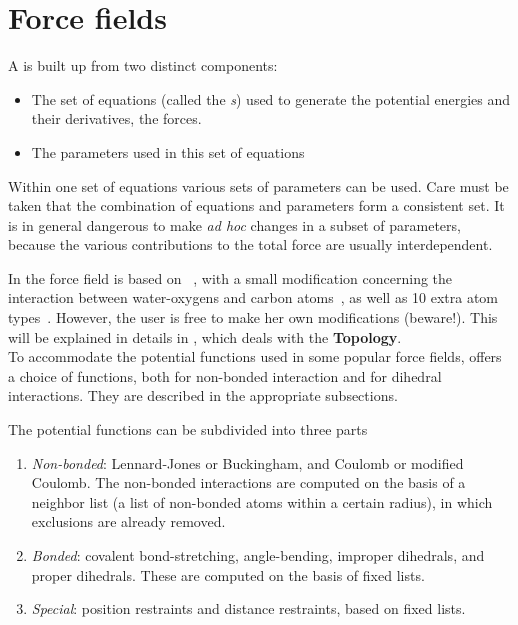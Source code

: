 % 
% 
% 
% 
% 
% 
% 
% 
%

\chapter{Force fields}
\label{ch:ff}
A  is built up from two distinct components:
\begin{itemize}
\item The set of equations (called the {\em
{}s}) used to generate the potential
energies and their derivatives, the forces.
\item The parameters used in this set of equations
\end{itemize}
Within one set of equations various sets of parameters can be
used. Care must be taken that the combination of equations and
parameters form a consistent set. It is in general dangerous to make
{\em ad hoc} changes in a subset of parameters, because the various
contributions to the total force are usually interdependent.

In {\gromacs} {\gmxver} the force field is based on
~\cite{biomos},
with a small modification concerning the interaction between
water-oxygens and carbon atoms~\cite{Buuren93b,Mark94}, as well as 10
extra atom types~\cite{Jorgensen83,Buuren93a,Buuren93b,Mark94,Liu95}.
However, the user is free to make her own modifications (beware!).
This will be explained in details in , which deals
with the {\bf Topology}.\\ To accommodate the potential functions used
in some popular force fields, {\gromacs} offers a choice of functions,
both for non-bonded interaction and for dihedral interactions. They
are described in the appropriate subsections.

The potential functions can be subdivided into three parts
\begin{enumerate}
\item   {\em Non-bonded}: Lennard-Jones or Buckingham, and Coulomb or
modified Coulomb. The non-bonded interactions are computed on the
basis of a neighbor list (a list of non-bonded atoms within a certain
radius), in which exclusions are already removed.
\item   {\em Bonded}: covalent bond-stretching, angle-bending,
improper dihedrals, and proper dihedrals. These are computed on the
basis of fixed lists. 
\item   {\em Special}: position restraints and distance restraints,
based on fixed lists. 
\end{enumerate}

